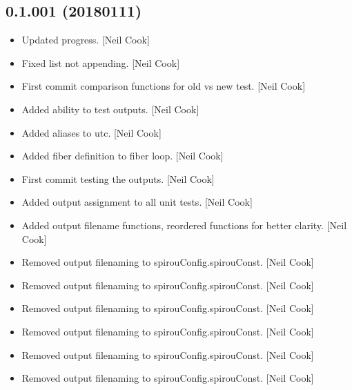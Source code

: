 \documentclass[a4paper,10pt,english]{report}
\begin{document}
\subsection{0.1.001 (2018\sphinxhyphen{}01\sphinxhyphen{}11)}
\label{\detokenize{misc/changelog:id521}}\begin{itemize}
\item {} 
Updated progress. {[}Neil Cook{]}

\item {} 
Fixed list not appending. {[}Neil Cook{]}

\item {} 
First commit \sphinxhyphen{} comparison functions for old vs new test. {[}Neil Cook{]}

\item {} 
Added ability to test outputs. {[}Neil Cook{]}

\item {} 
Added aliases to utc. {[}Neil Cook{]}

\item {} 
Added fiber definition to fiber loop. {[}Neil Cook{]}

\item {} 
First commit  \sphinxhyphen{} testing the outputs. {[}Neil Cook{]}

\item {} 
Added output assignment to all unit tests. {[}Neil Cook{]}

\item {} 
Added output filename functions, reordered functions for better
clarity. {[}Neil Cook{]}

\item {} 
Removed output filenaming to spirouConfig.spirouConst. {[}Neil Cook{]}

\item {} 
Removed output filenaming to spirouConfig.spirouConst. {[}Neil Cook{]}

\item {} 
Removed output filenaming to spirouConfig.spirouConst. {[}Neil Cook{]}

\item {} 
Removed output filenaming to spirouConfig.spirouConst. {[}Neil Cook{]}

\item {} 
Removed output filenaming to spirouConfig.spirouConst. {[}Neil Cook{]}

\item {} 
Removed output filenaming to spirouConfig.spirouConst. {[}Neil Cook{]}


\end{itemize}
\end{document}
